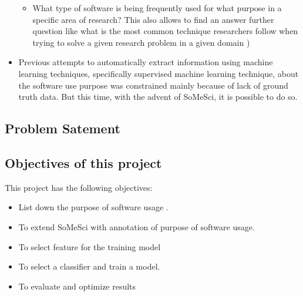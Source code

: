 \documentclass[12pt, a4paper]{article}
\begin{document}
\begin{itemize}
		\begin{itemize}
			\item What type of software is being frequently used for what purpose in a specific area of research? This also allows to find an answer further question like what is  the most common technique researchers follow when trying to solve a given research problem in a given domain )


		\end{itemize}	
	\item Previous attempts to automatically extract information using machine learning techniques, specifically supervised machine learning technique, about the software use purpose was constrained mainly because of lack of ground truth data. But this time, with the advent of SoMeSci, it is possible to do so. 	
	
\end{itemize}


\subsection{Problem Satement}
\subsection{Objectives of this project}
This project has the following objectives:
		
		\begin{itemize}[noitemsep,topsep=5pt]   %
	
			\item List down the purpose of software usage .
			\item To extend SoMeSci with annotation of purpose of software usage. 
			\item To select feature for the training model
			\item To select a classifier and train a model.
			\item To evaluate and optimize results 

		\end{itemize}	

\clearpage



\end{document}
